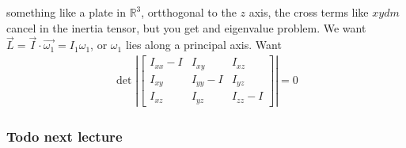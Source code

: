 \documentclass{article} \usepackage{amsmath} \usepackage{amssymb} \usepackage{amsthm} \usepackage[margin=0.2in]{geometry} \usepackage{hyperref} \usepackage{physics} \usepackage{tikz} \usepackage{mathtools} \mathtoolsset{showonlyrefs} \theoremstyle{definition} \newtheorem{theorem}{Theorem}[section] \newtheorem{corollary}{Corollary}[theorem] \newtheorem{lemma}[theorem]{Lemma} \newtheorem{definition}{Definition}[section] \author{Connor Duncan} \date{\today}
\begin{document}
something like a plate in $\mathbb{R}^3$, ortthogonal to the $z$ axis, the cross terms like $xydm$ cancel in the inertia tensor, but you get and eigenvalue problem. We want $\vec{L}=\vec{I}\cdot\vec{\omega_1}=I_1\omega_1$, or $\omega_1$ lies along a principal axis. Want \begin{align} \det\left|\begin{bmatrix} I_{xx}-I & I_{xy} & I_{xz}\\ I_{xy} & I_{yy}-I& I_{yz}\\ I_{xz} & I_{yz} & I_{zz}-I \end{bmatrix} \right|=0 \end{align} \subsubsection{Todo next lecture} \begin{center}  \end{center}
\end{document}
